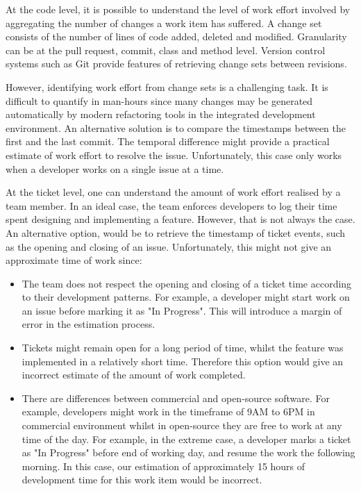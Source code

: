 \documentclass{mprop}
\begin{document}
\begin{enumerate}
	At the code level, it is possible to understand the level of work effort
	involved by aggregating the number of changes a work item has suffered. A
	change set consists of the number of lines of code added, deleted and
	modified. Granularity can be at the pull request, commit, class and method
	level. Version control systems such as Git provide features of retrieving
	change sets between revisions.
	
	However, identifying work effort from change sets is a challenging task. It
	is difficult to quantify in man-hours since many changes may be generated
	automatically by modern refactoring tools in the integrated development
	environment. An alternative solution is to compare the timestamps between
	the first and the last commit. The temporal difference might provide a
	practical estimate of work effort to resolve the issue. Unfortunately, this
	case only works when a developer works on a single issue at a time.

	At the ticket level, one can understand the amount of work effort realised
	by a team member. In an ideal case, the team enforces developers to log
	their time spent designing and implementing a feature. However, that is not
	always the case. An alternative option, would be to retrieve the timestamp
	of ticket events, such as the opening and closing of an issue.
	Unfortunately, this might not give an approximate time of work since: 
	\begin{itemize}
		\item The team does not respect the opening and closing of a ticket time
		according to their development patterns. For example, a developer might
		start work on an issue before marking it as "In Progress". This will
		introduce a margin of error in the estimation process.
		\item Tickets might remain open for a long period of time, whilst the
		feature was implemented in a relatively short time. Therefore this
		option would give an incorrect estimate of the amount of work completed.
		\item There are differences between commercial and open-source software.
		For example, developers might work in the timeframe of 9AM to 6PM in
		commercial environment whilst in open-source they are free to work at
		any time of the day. For example, in the extreme case, a developer marks
		a ticket as "In Progress" before end of working day, and resume the work
		the following morning. In this case, our estimation of approximately 15
		hours of development time for this work item would be incorrect.
	\end{itemize}


\end{enumerate}
\end{document}
